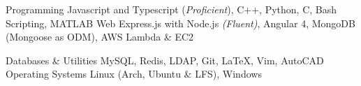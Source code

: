 \begin{cvskills}
	\cvskill
		{Programming}
		{ Javascript and Typescript (\textit{Proficient}), C++, Python, C, Bash Scripting, MATLAB}
	\cvskill
		{Web}
		{Express.js with Node.js \textit{(Fluent)}, Angular 4, MongoDB (Mongoose as ODM), AWS Lambda \& EC2}

	\cvskill
	{Databases \& Utilities}
		{MySQL, Redis, LDAP, Git, \LaTeX, Vim, AutoCAD}
	\cvskill
		{Operating Systems}
		{Linux (Arch, Ubuntu \& LFS), Windows}
\end{cvskills}

